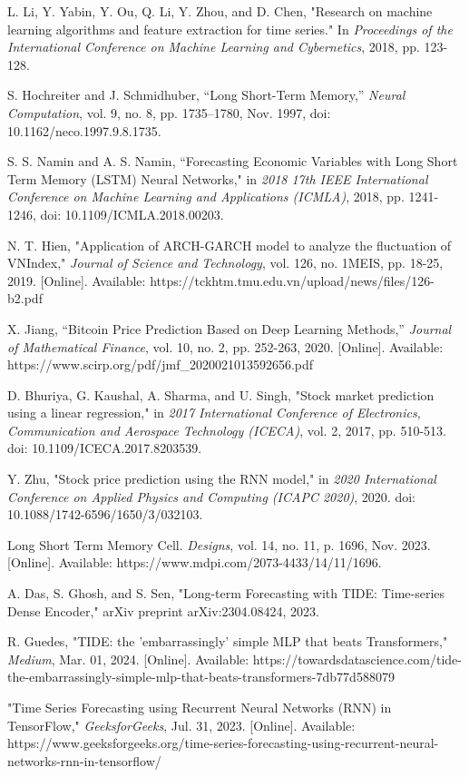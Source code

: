 \documentclass{ieeeojies}
\begin{document}
\begin{thebibliography}{00}

 L. Li, Y. Yabin, Y. Ou, Q. Li, Y. Zhou, and D. Chen, "Research on machine learning algorithms and feature extraction for time series." In \textit{Proceedings of the International Conference on Machine Learning and Cybernetics}, 2018, pp. 123-128.

 S. Hochreiter and J. Schmidhuber, “Long Short-Term Memory,” \textit{Neural Computation}, vol. 9, no. 8, pp. 1735–1780, Nov. 1997, doi: 10.1162/neco.1997.9.8.1735.

 S. S. Namin and A. S. Namin, “Forecasting Economic Variables with Long Short Term Memory (LSTM) Neural Networks," in \textit{2018 17th IEEE International Conference on Machine Learning and Applications (ICMLA)}, 2018, pp. 1241-1246, doi: 10.1109/ICMLA.2018.00203.

 N. T. Hien, "Application of ARCH-GARCH model to analyze the fluctuation of VNIndex," \textit{Journal of Science and Technology}, vol. 126, no. 1MEIS, pp. 18-25, 2019. [Online]. Available: https://tckhtm.tmu.edu.vn/upload/news/files/126-b2.pdf

 X. Jiang, “Bitcoin Price Prediction Based on Deep Learning Methods,” \textit{Journal of Mathematical Finance}, vol. 10, no. 2, pp. 252-263, 2020. [Online]. Available: https://www.scirp.org/pdf/jmf\_2020021013592656.pdf

 D. Bhuriya, G. Kaushal, A. Sharma, and U. Singh, "Stock market prediction using a linear regression," in \textit{2017 International Conference of Electronics, Communication and Aerospace Technology (ICECA)}, vol. 2, 2017, pp. 510-513. doi: 10.1109/ICECA.2017.8203539.

 Y. Zhu, "Stock price prediction using the RNN model," in \textit{2020 International Conference on Applied Physics and Computing (ICAPC 2020)}, 2020. doi: 10.1088/1742-6596/1650/3/032103.

 Long Short Term Memory Cell. \textit{Designs}, vol. 14, no. 11, p. 1696, Nov. 2023. [Online]. Available: https://www.mdpi.com/2073-4433/14/11/1696.

 A. Das, S. Ghosh, and S. Sen, "Long-term Forecasting with TIDE: Time-series Dense Encoder," arXiv preprint arXiv:2304.08424, 2023.

 R. Guedes, "TIDE: the 'embarrassingly' simple MLP that beats Transformers," \textit{Medium}, Mar. 01, 2024. [Online]. Available: https://towardsdatascience.com/tide-the-embarrassingly-simple-mlp-that-beats-transformers-7db77d588079

 "Time Series Forecasting using Recurrent Neural Networks (RNN) in TensorFlow," \textit{GeeksforGeeks}, Jul. 31, 2023. [Online]. Available: https://www.geeksforgeeks.org/time-series-forecasting-using-recurrent-neural-networks-rnn-in-tensorflow/

\end{thebibliography}


\EOD
\end{document}
